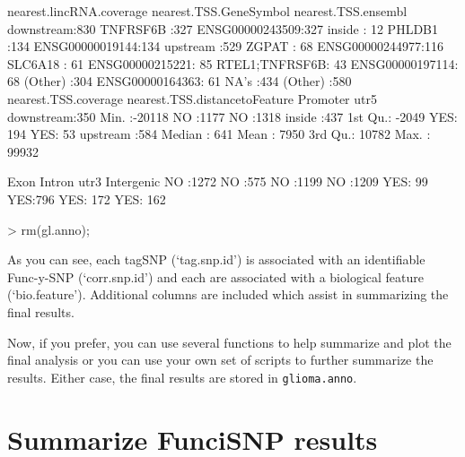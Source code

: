 \documentclass[12pt,fullpage]{article}
\newcommand{\Robject}[1]{{\texttt{#1}}}
\begin{document}
\begin{Schunk}
\begin{Soutput}
 nearest.lincRNA.coverage    nearest.TSS.GeneSymbol      nearest.TSS.ensembl
 downstream:830           TNFRSF6B      :327        ENSG00000243509:327     
 inside    : 12           PHLDB1        :134        ENSG00000019144:134     
 upstream  :529           ZGPAT         : 68        ENSG00000244977:116     
                          SLC6A18       : 61        ENSG00000215221: 85     
                          RTEL1;TNFRSF6B: 43        ENSG00000197114: 68     
                          (Other)       :304        ENSG00000164363: 61     
                          NA's          :434        (Other)        :580     
 nearest.TSS.coverage nearest.TSS.distancetoFeature Promoter    utr5     
 downstream:350       Min.   :-20118                NO :1177   NO :1318  
 inside    :437       1st Qu.: -2049                YES: 194   YES:  53  
 upstream  :584       Median :   641                                     
                      Mean   :  7950                                     
                      3rd Qu.: 10782                                     
                      Max.   : 99932                                     
                                                                         
  Exon      Intron     utr3      Intergenic
 NO :1272   NO :575   NO :1199   NO :1209  
 YES:  99   YES:796   YES: 172   YES: 162  
\end{Soutput}
\begin{Sinput}
> rm(gl.anno);
\end{Sinput}
\end{Schunk}

As you can see, each tagSNP (`tag.snp.id') is associated with an identifiable
Func-y-SNP (`corr.snp.id') and each are associated with a biological feature
(`bio.feature'). Additional columns are included which assist in summarizing the
final results.

Now, if you prefer, you can use several functions to help summarize and plot
the final analysis or you can use your own set of scripts to further summarize
the results.  Either case, the final results are stored in
\Robject{glioma.anno}.

\section{Summarize FunciSNP results}
\end{document}
